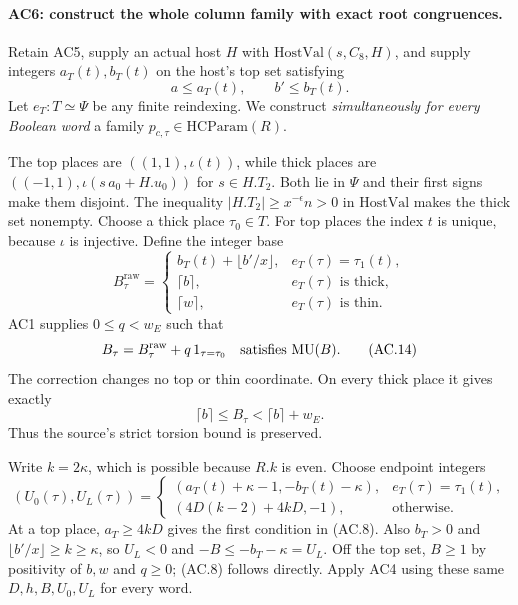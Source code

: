 \paragraph{AC6: construct the whole column family with exact root congruences.}
Retain AC5, supply an actual host $H$ with
$\mathrm{HostVal}(s,C_8,H)$, and supply integers $a_T(t),b_T(t)$
on the host's top set satisfying
\[
                         a\leq a_T(t),\qquad b'\leq b_T(t).
                                                               \tag{AC.12}
\]
Let $e_T:T\simeq\Psi$ be any finite reindexing. We construct
\emph{simultaneously for every Boolean word} a family
$p_{c,\tau}\in\mathrm{HCParam}(R)$.

The top places are $((1,1),\iota(t))$, while thick places are
$((-1,1),\iota(s\,a_0+H.u_0))$ for $s\in H.T_2$.
Both lie in $\Psi$ and their first signs make them disjoint.
The inequality $|H.T_2|\geq x^{-\epsilon}n>0$ in
$\mathrm{HostVal}$ makes the thick set nonempty.
Choose a thick place $\tau_0\in T$.
For top places the index $t$ is unique, because $\iota$ is injective.
Define the integer base
\[
 B^{\mathrm{raw}}_\tau=
 \begin{cases}
 b_T(t)+\lfloor b'/x\rfloor,&e_T(\tau)=\tau_1(t),\\
 \lceil b\rceil,&e_T(\tau)\text{ is thick},\\
 \lceil w\rceil,&e_T(\tau)\text{ is thin}.
 \end{cases}                                                 \tag{AC.13}
\]
AC1 supplies $0\leq q<w_E$ such that
\[
             B_\tau=B^{\mathrm{raw}}_\tau+q\,1_{\tau=\tau_0}
                          \quad\hbox{satisfies }\mathrm{MU}(B).
                                                               \tag{AC.14}
\]
The correction changes no top or thin coordinate. On every thick
place it gives exactly
\[
                 \lceil b\rceil\leq B_\tau
                            <\lceil b\rceil+w_E.             \tag{AC.15}
\]
Thus the source's strict torsion bound is preserved.

Write $k=2\kappa$, which is possible because $R.k$ is even.
Choose endpoint integers
\[
 (U_0(\tau),U_L(\tau))=
 \begin{cases}
 (a_T(t)+\kappa-1,-b_T(t)-\kappa),
                                  &e_T(\tau)=\tau_1(t),\\
 (4D(k-2)+4kD,-1),                &\text{otherwise}.
 \end{cases}                                                 \tag{AC.16}
\]
At a top place, $a_T\geq4kD$ gives the first condition in (AC.8).
Also $b_T>0$ and
$\lfloor b'/x\rfloor\geq k\geq\kappa$, so $U_L<0$ and
$-B\leq-b_T-\kappa=U_L$.
Off the top set, $B\geq1$ by positivity of $b,w$ and $q\geq0$;
(AC.8) follows directly. Apply AC4 using these same $D,h,B,U_0,U_L$
for every word.

